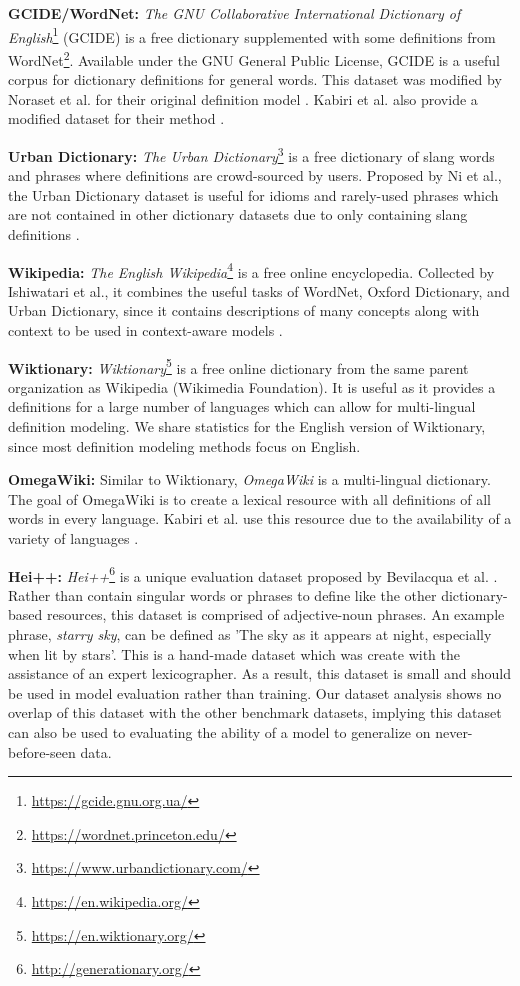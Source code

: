 \textbf{GCIDE/WordNet:}
\textit{The GNU Collaborative International Dictionary of
    English}\footnote{\href{https://gcide.gnu.org.ua/}{https://gcide.gnu.org.ua/}}
(GCIDE) is a free dictionary supplemented with some definitions from
WordNet\footnote{\href{https://wordnet.princeton.edu/}{https://wordnet.princeton.edu/}}.
Available under the GNU General Public License, GCIDE is a useful corpus for
dictionary definitions for general words. This dataset was modified by
Noraset et al. for their original definition model
\cite{noraset_definition_2016}. Kabiri et al. also provide a modified
dataset for their method \cite{kabiri_evaluating_2020}.

\textbf{Urban Dictionary:}
\textit{The Urban
    Dictionary}\footnote{\href{https://www.urbandictionary.com/}{https://www.urbandictionary.com/}}
is a free dictionary of slang words and phrases where definitions are
crowd-sourced by users. Proposed by Ni et al., the Urban Dictionary dataset
is useful for idioms and rarely-used phrases which are not contained in
other dictionary datasets due to only containing slang definitions
\cite{ni_learning_2017}.

\textbf{Wikipedia:}
\textit{The English
    Wikipedia}\footnote{\href{https://en.wikipedia.org/}{https://en.wikipedia.org/}}
is a free online encyclopedia. Collected by Ishiwatari et al., it combines
the useful tasks of WordNet, Oxford Dictionary, and Urban Dictionary, since
it contains descriptions of many concepts along with context to be used in
context-aware models \cite{ishiwatari_learning_2019}.

\textbf{Wiktionary:}
\textit{Wiktionary}\footnote{\href{https://en.wiktionary.org/}{https://en.wiktionary.org/}}
is a free online dictionary from the same parent organization as Wikipedia
(Wikimedia Foundation). It is useful as it provides a definitions for a large
number of languages which can allow for multi-lingual definition modeling. We
share statistics for the English version of Wiktionary, since most definition
modeling methods focus on English.

\textbf{OmegaWiki:}
Similar to Wiktionary, \textit{OmegaWiki} is a multi-lingual dictionary. The
goal of OmegaWiki is to create a lexical resource with all definitions of all
words in every language. Kabiri et al. use this resource due to the availability
of a variety of languages \cite{kabiri_evaluating_2020}.

\textbf{Hei++:}
\textit{Hei++}\footnote{\href{http://generationary.org/}{http://generationary.org/}}
is a unique evaluation dataset proposed by Bevilacqua et al.
\cite{bevilacqua_generationary_2020}. Rather than contain singular words or
phrases to define like the other dictionary-based resources, this dataset is
comprised of adjective-noun phrases. An example phrase, \textit{starry sky}, can
be defined as 'The sky as it appears at night, especially when lit by stars'.
This is a hand-made dataset which was create with the assistance of an expert
lexicographer. As a result, this dataset is small and should be used in model
evaluation rather than training. Our dataset analysis shows no overlap of this
dataset with the other benchmark datasets, implying this dataset can also be
used to evaluating the ability of a model to generalize on never-before-seen
data.

